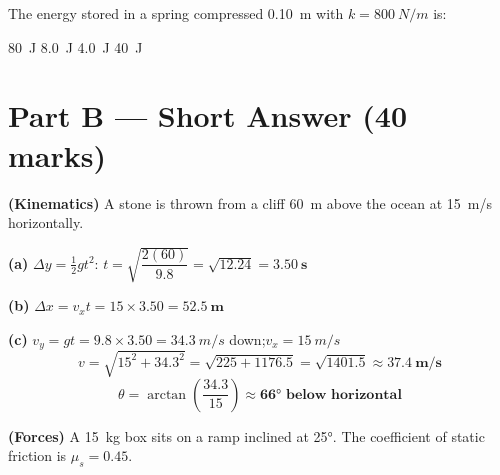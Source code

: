 \documentclass[addpoints]{exam}
\begin{document}
\begin{questions}
\question[1] The energy stored in a spring compressed \SI{0.10}{m} with $k = \SI{800}{N/m}$ is:
\begin{choices}
    \choice \SI{80}{J}
    \choice \SI{8.0}{J}
    \correctchoice \SI{4.0}{J}
    \choice \SI{40}{J}
\end{choices}


\section*{Part B --- Short Answer (40 marks)}

\question \textbf{(Kinematics)} A stone is thrown from a cliff \SI{60}{m} above the
ocean at \SI{15}{m/s} horizontally.
\begin{solution}[9cm]
\textbf{(a)} $\Delta y = \tfrac{1}{2}gt^2$:\quad
$t = \sqrt{\dfrac{2(60)}{9.8}} = \sqrt{12.24} = \mathbf{\SI{3.50}{s}}$

\textbf{(b)} $\Delta x = v_x t = 15 \times 3.50 = \mathbf{\SI{52.5}{m}}$

\textbf{(c)} $v_y = gt = 9.8 \times 3.50 = \SI{34.3}{m/s}$ down;\quad $v_x = \SI{15}{m/s}$
\[
v = \sqrt{15^2 + 34.3^2} = \sqrt{225 + 1176.5} = \sqrt{1401.5} \approx \mathbf{\SI{37.4}{m/s}}
\]
\[
\theta = \arctan\!\left(\frac{34.3}{15}\right) \approx \mathbf{\ang{66} \text{ below horizontal}}
\]
\end{solution}

\question \textbf{(Forces)} A \SI{15}{kg} box sits on a ramp inclined at \ang{25}.
The coefficient of static friction is $\mu_s = 0.45$.
\end{questions}
\end{document}
